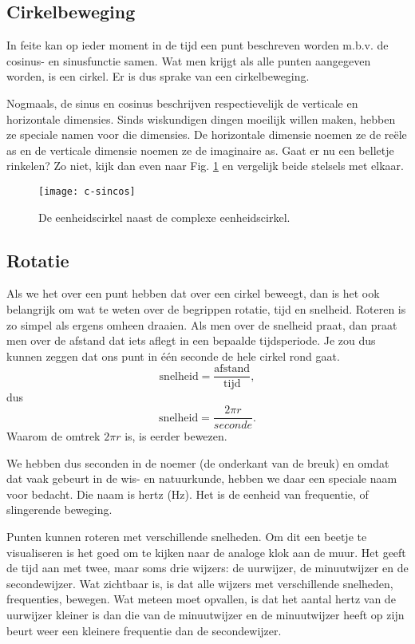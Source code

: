\documentclass[11pt,fleqn]{book} %
\begin{document}
\subsection{Cirkelbeweging}
In feite kan op ieder moment in de tijd een punt beschreven worden m.b.v. de cosinus- en sinusfunctie samen. Wat men krijgt als alle punten aangegeven worden, is een cirkel. Er is dus sprake van een cirkelbeweging.

Nogmaals, de sinus en cosinus beschrijven respectievelijk de verticale en horizontale dimensies. Sinds wiskundigen dingen moeilijk willen maken, hebben ze speciale namen voor die dimensies. De horizontale dimensie noemen ze de reële as en de verticale dimensie noemen ze de imaginaire as. Gaat er nu een belletje rinkelen? Zo niet, kijk dan even naar Fig. \ref{fig:c-sincos} en vergelijk beide stelsels met elkaar.
\begin{figure}[h]
	\centering\texttt{[image: c-sincos]}
	\caption{De eenheidscirkel naast de complexe eenheidscirkel.}
	\label{fig:c-sincos}
\end{figure}

\subsection{Rotatie}
Als we het over een punt hebben dat over een cirkel beweegt, dan is het ook belangrijk om wat te weten over de begrippen rotatie, tijd en snelheid. Roteren is zo simpel als ergens omheen draaien. Als men over de snelheid praat, dan praat men over de afstand dat iets aflegt in een bepaalde tijdsperiode. Je zou dus kunnen zeggen dat ons punt in één seconde de hele cirkel rond gaat.
\begin{displaymath}
	\text{snelheid}=\frac{\text{afstand}}{\text{tijd}},
\end{displaymath}
dus
\begin{displaymath}
	\text{snelheid}=\frac{2\pi r}{seconde}.
\end{displaymath}
Waarom de omtrek $2\pi r$ is, is eerder bewezen.

We hebben dus seconden in de noemer (de onderkant van de breuk) en omdat dat vaak gebeurt in de wis- en natuurkunde, hebben we daar een speciale naam voor bedacht. Die naam is hertz (Hz). Het is de eenheid van frequentie, of slingerende beweging.

Punten kunnen roteren met verschillende snelheden. Om dit een beetje te visualiseren is het goed om te kijken naar de analoge klok aan de muur. Het geeft de tijd aan met twee, maar soms drie wijzers: de uurwijzer, de minuutwijzer en de secondewijzer. Wat zichtbaar is, is dat alle wijzers met verschillende snelheden, frequenties, bewegen. Wat meteen moet opvallen, is dat het aantal hertz van de uurwijzer kleiner is dan die van de minuutwijzer en de minuutwijzer heeft op zijn beurt weer een kleinere frequentie dan de secondewijzer.
\end{document}
